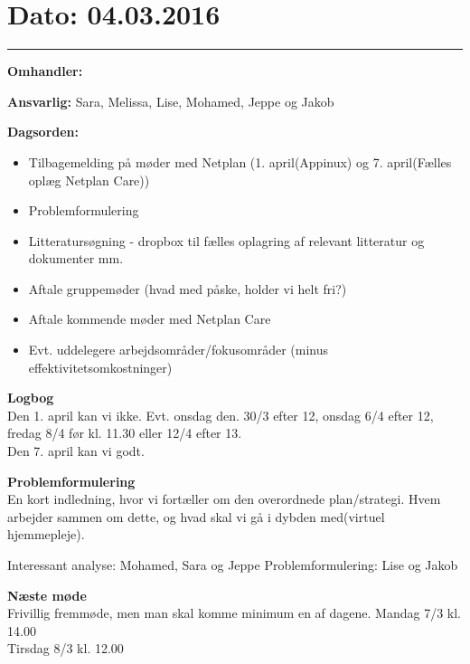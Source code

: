 \section{Dato: 04.03.2016}
\hrule

\textbf{Omhandler:}

\textbf{Ansvarlig:} Sara, Melissa, Lise, Mohamed, Jeppe og Jakob

\textbf{Dagsorden:}
\begin{itemize}
	\item Tilbagemelding på møder med Netplan (1. april(Appinux) og 7. april(Fælles oplæg Netplan Care))
	\item Problemformulering
	\item Litteratursøgning - dropbox til fælles oplagring af relevant litteratur og dokumenter mm.
	\item Aftale gruppemøder (hvad med påske, holder vi helt fri?)
	\item Aftale kommende møder med Netplan Care
	\item Evt. uddelegere arbejdsområder/fokusområder (minus effektivitetsomkostninger)
\end{itemize}

\textbf{Logbog}
\\
Den 1. april kan vi ikke. Evt. onsdag den. 30/3 efter 12, onsdag 6/4 efter 12, fredag 8/4 før kl. 11.30 eller 12/4 efter 13.\\
Den 7. april kan vi godt.

\textbf{Problemformulering}
\\
En kort indledning, hvor vi fortæller om den overordnede plan/strategi. Hvem arbejder sammen om dette, og hvad skal vi gå i dybden med(virtuel hjemmepleje).


Interessant analyse: Mohamed, Sara og Jeppe
Problemformulering: Lise og Jakob

\textbf{Næste møde}
\\
Frivillig fremmøde, men man skal komme minimum en af dagene.
Mandag 7/3 kl. 14.00\\
Tirsdag 8/3 kl. 12.00\\